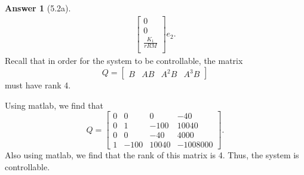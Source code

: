 \documentclass{article}
\theoremstyle{definition}
\newtheorem*{ans}{Answer}
\begin{document}
\begin{ans}[5.2a]
\begin{align*}
\begin{bmatrix}
                0 \\
                0 \\
                \frac{K_1}{rRM} \\
            \end{bmatrix}
            e_2
            .
        \end{align*}
        Recall that in order for the system to be controllable,
        the matrix 
        \begin{equation*}
            Q = 
            \begin{bmatrix}
                B & AB & A^2 B & A^3 B
            \end{bmatrix}
        \end{equation*}
        must have rank 4.

        Using matlab, we find that
        \begin{equation*}
            Q = 
            \begin{bmatrix}
                0   &       0   &       0  &      -40 \\
                0   &       1   &    -100  &    10040 \\
                0   &       0   &     -40  &     4000 \\
                1   &    -100   &   10040  & -1008000
            \end{bmatrix}
            .
        \end{equation*}
        Also using matlab, we find that the rank of this matrix is 4.
        Thus, the system is controllable.
    \end{ans}
\end{document}
